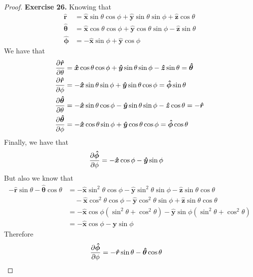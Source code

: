 \documentclass[11pt]{article}
\newcommand{\hatx}{\bm{\hat{x}}}
\newcommand{\haty}{\bm{\hat{y}}}
\newcommand{\hatz}{\bm{\hat{z}}}
\newcommand{\hatr}{\bm{\hat{r}}}
\newcommand{\hatphi}{\bm{\hat{\phi}}}
\newcommand{\hattheta}{\bm{\hat{\theta}}}
\theoremstyle{definition}
\begin{document}
\begin{proof}{\textbf{Exercise 26.}}
    Knowing that
    \begin{align*}
        \hatr &= \hatx\sin\theta\cos\phi + \haty\sin\theta\sin\phi + \hatz\cos\theta\\
        \hattheta &= \hatx\cos\theta\cos\phi + \haty\cos\theta\sin\phi - \hatz\sin\theta\\
        \hatphi &= -\hatx \sin\phi + \haty\cos\phi
    \end{align*}
    We have that
    \begin{align*}
        \partialderivative{\hatr}{\theta}
        &= \hatx \cos\theta\cos\phi + \haty \sin\theta\sin\phi - \hatz\sin\theta
        = \hattheta\\
        \partialderivative{\hatr}{\phi}
        &= -\hatx \sin\theta\sin\phi + \haty \sin\theta\cos\phi
        = \hatphi\sin\theta\\
        \partialderivative{\hattheta}{\theta}
        &= -\hatx \sin\theta\cos\phi - \haty \sin\theta\sin\phi - \hatz \cos\theta
        = -\hatr\\
        \partialderivative{\hattheta}{\phi}
        &= -\hatx \cos\theta\sin\phi + \haty \cos\theta\cos\phi
        = \hatphi \cos\theta
    \end{align*}
    Finally, we have that
    \begin{align*}
        \partialderivative{\hatphi}{\phi}
        &= -\hatx \cos\phi - \haty \sin\phi
    \end{align*}
    But also we know that
    \begin{align*}
        -\hatr\sin\theta - \hattheta\cos\theta
        &= -\hatx\sin^2\theta\cos\phi - \haty\sin^2\theta\sin\phi - \hatz\sin\theta\cos\theta\\
        &\quad-\hatx\cos^2\theta\cos\phi - \haty\cos^2\theta\sin\phi + \hatz\sin\theta\cos\theta\\
        &= -\hatx\cos\phi(\sin^2\theta + \cos^2\theta)
        - \haty\sin\phi(\sin^2\theta + \cos^2\theta)\\
        &= -\hatx\cos\phi - \haty\sin\phi
    \end{align*}
    Therefore
    \begin{align*}
        \partialderivative{\hatphi}{\phi}
        &= -\hatr\sin\theta - \hattheta\cos\theta
    \end{align*}
\end{proof}
\cleardoublepage
\end{document}
